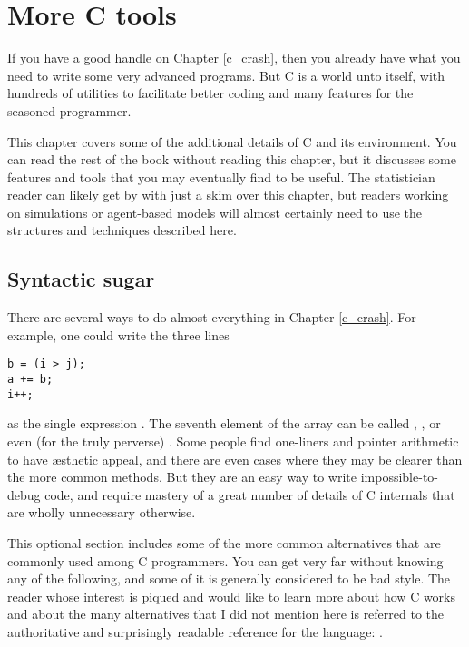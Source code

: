 \chapter{\treesymbol More C tools} \label{ctwo}

If you have a good handle on Chapter \ref{c_crash}, then you already
have what you need to write some very advanced programs. But C is a
world unto itself, with hundreds of utilities to facilitate better
coding and many features for the seasoned programmer.

This chapter covers some of the additional details of C and its
environment. You can read the rest of the book without reading this
chapter, but it discusses some features and tools that you may
eventually find to be useful. The statistician reader can likely get by
with just a skim over this chapter, but readers working on simulations
or agent-based models will almost certainly need to use the structures
and techniques described here.

\section{Syntactic sugar}   
There are several ways to do almost everything in Chapter \ref{c_crash}.  For
example, one could write the three lines
\begin{lstlisting}
b = (i > j); 
a += b;
i++;
\end{lstlisting}

as the single expression . The seventh
element of the array  can be called ,
, or even (for the truly perverse) .  Some people find one-liners and pointer arithmetic
to have \ae{}sthetic appeal, and there are even cases where they may
be clearer than the more common methods. But they are an easy way to
write impossible-to-debug code, and require mastery of a great number
of details of C internals that are wholly unnecessary otherwise.

This optional section includes some of the more common alternatives that
are commonly used among C programmers. You can get very far without
knowing any of the following, and some of it is generally considered to
be bad style. The reader whose interest is piqued and would like to
learn more about how C works and about the many alternatives that I
did not mention here is referred to the authoritative and surprisingly
readable reference for the language: \cite{kandr:c}.


